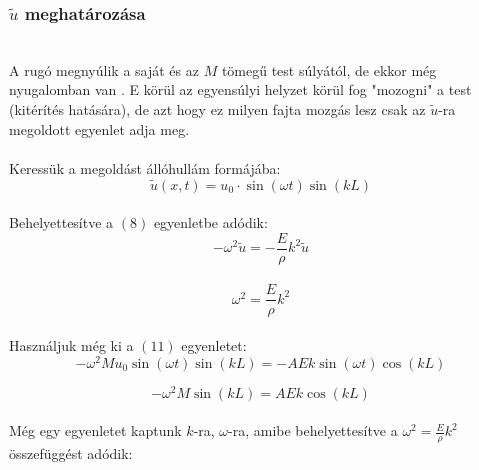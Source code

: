 \documentclass[a4paper]{article}
\begin{document}
\subsubsection*{$\tilde{u}$ meghatározása}
\\
A rugó megnyúlik a saját és az $M$ tömegű test súlyától, de ekkor még nyugalomban van . E körül az egyensúlyi helyzet körül fog "mozogni" a test (kitérítés hatására), de azt hogy ez milyen fajta mozgás lesz csak az $\tilde{u} $-ra megoldott egyenlet adja meg.
\\
\\
Keressük a megoldást állóhullám formájába:
\begin{equation}
\tilde{u}(x,t)=u_{0} \cdot \sin(\omega t)\sin(kL)
\end{equation}
\\
Behelyettesítve a $(8)$ egyenletbe adódik:
\begin{equation}
- \omega^{2} \tilde{u}=- \frac{E}{\rho}k^{2} \tilde{u}
\end{equation}
\\
\begin{equation}
\omega^{2} =\frac{E}{\rho}k^{2}
\end{equation}
\\
Használjuk még ki a $(11)$ egyenletet:
\begin{equation}
-\omega^{2}M u_0 \sin(\omega t) \sin(kL)=-AEk \sin(\omega t) \cos(kL)
\end{equation}

\begin{equation}
-\omega^{2}M\sin(kL)=AEk \cos(kL)
\end{equation}
\\
Még egy egyenletet kaptunk $k$-ra, $\omega$-ra, amibe behelyettesítve a $\omega^{2} =\frac{E}{\rho}k^{2}$ összefüggést adódik:
\end{document}

